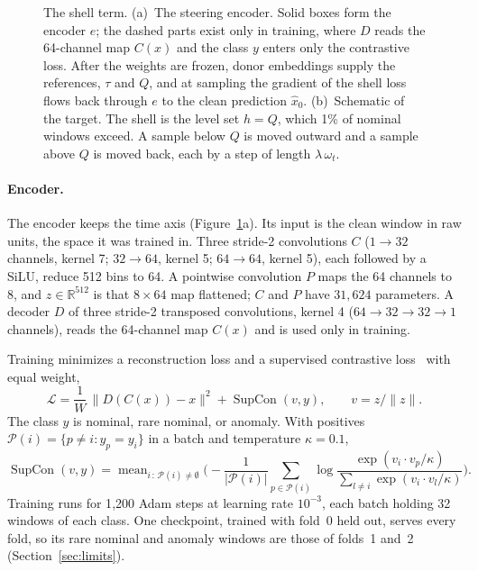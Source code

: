 \documentclass[11pt,a4paper]{article}
\newcommand{\R}{\mathbb{R}}
\newcommand{\xhat}{\hat{x}_{0}}            %
\newcommand{\norm}[1]{\lVert #1 \rVert}
\DeclareMathOperator{\mean}{mean}
\DeclareMathOperator{\SupCon}{SupCon}
\begin{document}
\begin{figure}[t]
\caption{The shell term. (a)~The steering encoder. Solid boxes form the
encoder $e$; the dashed parts exist only in training, where $D$ reads the
64-channel map $C(x)$ and the class $y$ enters only the contrastive loss.
After the weights are frozen, donor embeddings supply the references, $\tau$
and $Q$, and at sampling the gradient of the shell loss flows back through $e$
to the clean prediction $\xhat$. (b)~Schematic of the target. The shell is the
level set $h = Q$, which 1\% of nominal windows exceed. A sample below $Q$ is
moved outward and a sample above $Q$ is moved back, each by a step of length
$\lambda\,\omega_{t}$.}
\label{fig:encoder}
\end{figure}

\paragraph{Encoder.}
The encoder keeps the time axis (Figure~\ref{fig:encoder}a). Its input is the
clean window in raw units, the space it was trained in. Three stride-2
convolutions $C$ ($1 \to 32$ channels, kernel 7; $32 \to 64$, kernel 5;
$64 \to 64$, kernel 5), each followed by a SiLU, reduce 512 bins to 64. A
pointwise convolution $P$ maps the 64 channels to 8, and $z \in \R^{512}$ is
that $8 \times 64$ map flattened; $C$ and $P$ have $31{,}624$ parameters. A
decoder $D$ of three stride-2 transposed convolutions, kernel 4
($64 \to 32 \to 32 \to 1$ channels), reads the 64-channel map $C(x)$ and is
used only in training.

Training minimizes a reconstruction loss and a supervised contrastive
loss~\cite{khosla2020supcon} with equal weight,
\begin{equation}
\label{eq:encloss}
\mathcal{L}
  = \frac{1}{W}\,\norm{D(C(x)) - x}^{2} + \SupCon(v, y),
\qquad
v = z / \norm{z} .
\end{equation}
The class $y$ is nominal, rare nominal, or anomaly. With positives
$\mathcal{P}(i) = \{p \neq i : y_{p} = y_{i}\}$ in a batch and temperature
$\kappa = 0.1$,
\begin{equation}
\label{eq:supcon}
\SupCon(v, y)
  = \mean_{i\,:\,\mathcal{P}(i)\neq\emptyset}
    \Biggl(
      -\frac{1}{\lvert \mathcal{P}(i)\rvert}
      \sum_{p \in \mathcal{P}(i)}
      \log
      \frac{\exp(v_{i}\cdot v_{p}/\kappa)}
           {\sum_{l \neq i}\exp(v_{i}\cdot v_{l}/\kappa)}
    \Biggr).
\end{equation}
Training runs for 1{,}200 Adam steps at learning rate $10^{-3}$, each batch
holding 32 windows of each class. One checkpoint, trained with fold~0 held
out, serves every fold, so its rare nominal and anomaly windows are those of
folds~1 and~2 (Section~\ref{sec:limits}).
\end{document}
